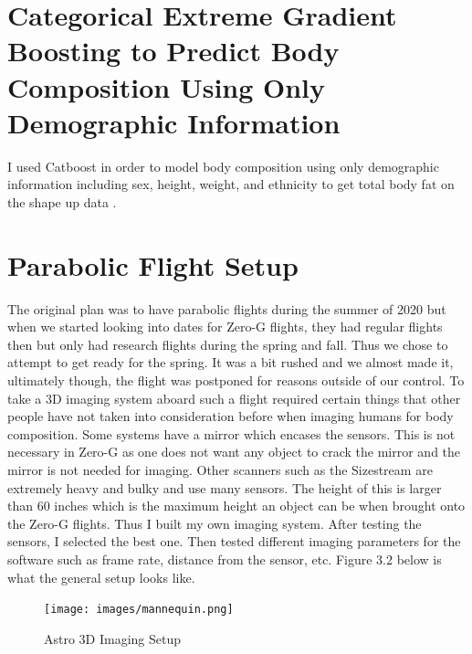\section{Categorical Extreme Gradient Boosting to Predict Body Composition Using Only Demographic Information}
I used Catboost \cite{DBLP:journals/corr/DorogushGGKPV17} in order to model body composition using only demographic information including sex, height, weight, and ethnicity to get total body fat on the shape up data \cite{article}. 

\section{Parabolic Flight Setup}
The original plan was to have parabolic flights during the summer of 2020 but when we started looking into dates for Zero-G flights, they had regular flights then but only had research flights during the spring and fall. Thus we chose to attempt to get ready for the spring. It was a bit rushed and we almost made it, ultimately though, the flight was postponed for reasons outside of our control.
To take a 3D imaging system aboard such a flight required certain things that other people have not taken into consideration before when imaging humans for body composition. Some systems have a mirror which encases the sensors. This is not necessary in Zero-G as one does not want any object to crack the mirror and the mirror is not needed for imaging. Other scanners such as the Sizestream are extremely heavy and bulky and use many sensors. The height of this is larger than 60 inches which is the maximum height an object can be when brought onto the Zero-G flights. Thus I built my own imaging system. After testing the sensors, I selected the best one. Then tested different imaging parameters for the software such as frame rate, distance from the sensor, etc.
Figure 3.2 below is what the general setup looks like.
\begin{figure}[!htb]
	\caption{Astro 3D Imaging Setup}
	\centering
	\texttt{[image: images/mannequin.png]}
\end{figure}

